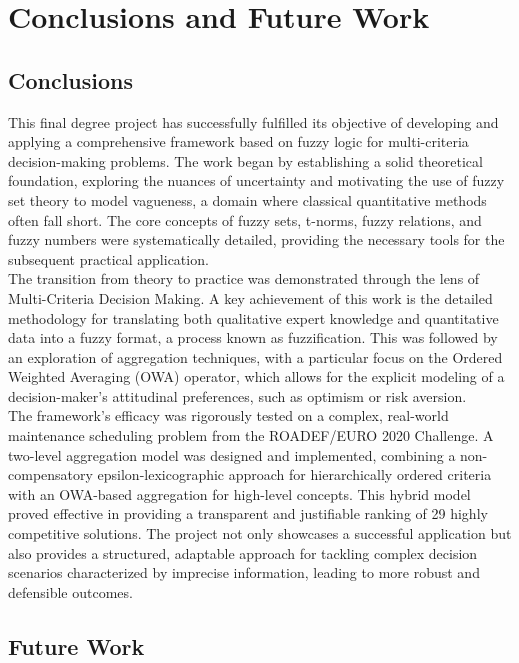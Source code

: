 \chapter*{Conclusions and Future Work}

\section*{Conclusions}

This final degree project has successfully fulfilled its objective of developing and applying a comprehensive framework based on fuzzy logic for multi-criteria decision-making problems. The work began by establishing a solid theoretical foundation, exploring the nuances of uncertainty and motivating the use of fuzzy set theory to model vagueness, a domain where classical quantitative methods often fall short. The core concepts of fuzzy sets, t-norms, fuzzy relations, and fuzzy numbers were systematically detailed, providing the necessary tools for the subsequent practical application.\\

The transition from theory to practice was demonstrated through the lens of Multi-Criteria Decision Making. A key achievement of this work is the detailed methodology for translating both qualitative expert knowledge and quantitative data into a fuzzy format, a process known as fuzzification. This was followed by an exploration of aggregation techniques, with a particular focus on the Ordered Weighted Averaging (OWA) operator, which allows for the explicit modeling of a decision-maker's attitudinal preferences, such as optimism or risk aversion.\\

The framework's efficacy was rigorously tested on a complex, real-world maintenance scheduling problem from the ROADEF/EURO 2020 Challenge. A two-level aggregation model was designed and implemented, combining a non-compensatory epsilon-lexicographic approach for hierarchically ordered criteria with an OWA-based aggregation for high-level concepts. This hybrid model proved effective in providing a transparent and justifiable ranking of 29 highly competitive solutions. The project not only showcases a successful application but also provides a structured, adaptable approach for tackling complex decision scenarios characterized by imprecise information, leading to more robust and defensible outcomes.

\section*{Future Work}

